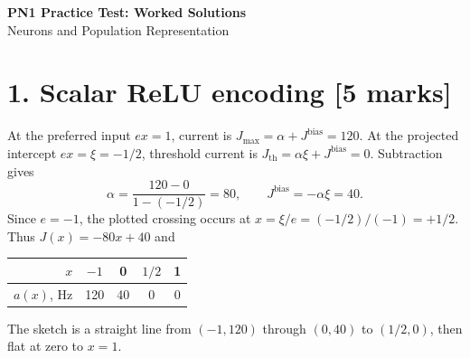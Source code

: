 \documentclass[10pt,letterpaper]{article}
\begin{document}
\begin{center}
{\Large\bfseries PN1 Practice Test: Worked Solutions}\\[2pt]
Neurons and Population Representation
\end{center}

\section*{1. Scalar ReLU encoding [5 marks]}
At the preferred input \(e x=1\), current is \(J_{\max}=\alpha+J^{\mathrm{bias}}=120\). At the projected intercept \(e x=\xi=-1/2\), threshold current is \(J_{\mathrm{th}}=\alpha\xi+J^{\mathrm{bias}}=0\). Subtraction gives
\[
\alpha=\frac{120-0}{1-(-1/2)}=80,\qquad J^{\mathrm{bias}}=-\alpha\xi=40.
\]
Since \(e=-1\), the plotted crossing occurs at \(x=\xi/e=(-1/2)/(-1)=+1/2\). Thus \(J(x)=-80x+40\) and
\begin{center}\begin{tabular}{rcccc}\toprule \(x\) & \(-1\) & 0 & \(1/2\) & 1\\\midrule \(a(x)\), Hz & 120 & 40 & 0 & 0\\\bottomrule\end{tabular}\end{center}
The sketch is a straight line from \((-1,120)\) through \((0,40)\) to \((1/2,0)\), then flat at zero to \(x=1\).
\end{document}
